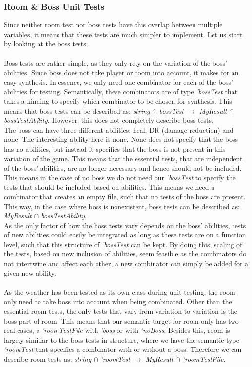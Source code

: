 \subsubsection{Room \& Boss Unit Tests}
Since neither room test nor boss tests have this overlap between multiple variables, it means that these tests are much simpler to implement. Let us start by looking at the boss tests. \\
\\
Boss tests are rather simple, as they only rely on the variation of the boss' abilities. Since boss does not take player or room into account, it makes for an easy synthesis. In essence, we only need one combinator for each of the boss' abilities for testing. Semantically, these combinators are of type \textit{'bossTest} that takes a kinding to specify which combinator to be chosen for synthesis. This means that boss tests can be described as: \textit{string $\cap$ bossTest $\to$ MyResult $\cap$ bossTestAbility}. However, this does not completely describe boss tests. \\
The boss can have three different abilities: heal, DR (damage reduction) and none. The interesting ability here is none. None does not specify that the boss has no abilities, but instead it specifies that the boss is not present in this variation of the game. This means that the essential tests, that are independent of the boss' abilities, are no longer necessary and hence should not be included. This means in the case of no boss we do not need our \textit{'bossTest} to specify the tests that should be included based on abilities. This means we need a combinator that creates an empty file, such that no tests of the boss are present. This way, in the case where boss is nonexistent, boss tests can be described as: \textit{MyResult $\cap$ bossTestAbility}. \\
As the only factor of how the boss tests vary depends on the boss' abilities, tests of new abilities could easily be integrated as long as these tests are on a function level, such that this structure of \textit{'bossTest} can be kept. By doing this, scaling of the tests, based on new inclusion of abilities, seem feasible as the combinators do not intertwine and affect each other, a new combinator can simply be added for a given new ability. %
\\ \\
As the weather has been tested as its own class during unit testing, the room only need to take boss into account when being combinated. Other than the essential room tests, the only tests that vary from variation to variation is the boss part of room. This means that our semantic target for room only has two real cases, a \textit{'roomTestFile} with \textit{'boss} or with \textit{'noBoss}. Besides this, room is largely similiar to the boss tests in structure, where we have the semantic type \textit{'roomTest} that specifies a combinator with or without a boss. Therefore we can describe room tests as: \textit{string $\cap$ 'roomTest $\to$ MyResult $\cap$ 'roomTestFile}. 